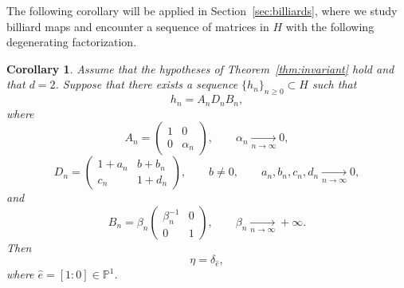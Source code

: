 \documentclass[a4paper,12pt,reqno]{amsart}
\numberwithin{equation}{section}
\newtheorem{corollary}[theorem]{Corollary}
\newcommand{\Pp}{{\mathbb{P}}}
\def\tr{\operatorname{tr}}
\begin{document}




The following corollary will be applied in Section~\ref{sec:billiards}, where we study billiard maps and encounter a sequence of matrices in $H$
with the following degenerating factorization.

\begin{corollary}
\label{cor:K}
Assume that the hypotheses of Theorem~\ref{thm:invariant} hold
and that $d=2$. Suppose that there exists a sequence $\{h_n\}_{n\geq 0}\subset H$ such that
\[
h_n=A_nD_nB_n,
\]
where
\[
A_n=
\begin{pmatrix}
1 & 0\\
0 & \alpha_n
\end{pmatrix},
\qquad
\alpha_n \xrightarrow[n\to\infty]{}0,
\]
\[
D_n=
\begin{pmatrix}
1+a_n & b+b_n\\
c_n & 1+d_n
\end{pmatrix},
\qquad
b\neq0,
\qquad
a_n,b_n,c_n,d_n \xrightarrow[n\to\infty]{}0,
\]
and
\[
B_n=\beta_n
\begin{pmatrix}
\beta_n^{-1} & 0\\
0 & 1
\end{pmatrix},
\qquad
\beta_n \xrightarrow[n\to\infty]{}+\infty.
\]
Then
\[
\eta=\delta_{\hat e},
\]
where $\hat e=[1:0]\in\Pp^1$.
\end{corollary}
\end{document}
